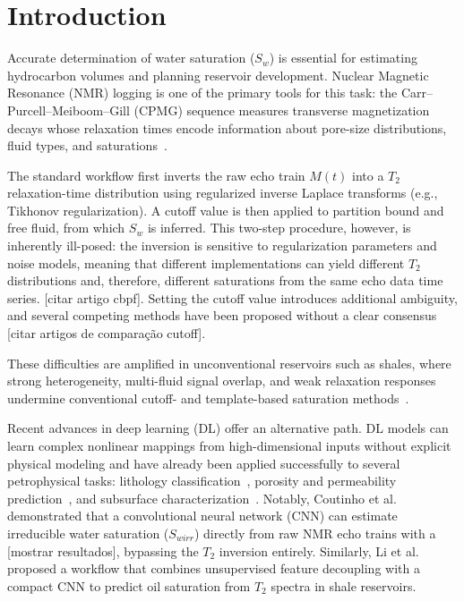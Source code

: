 \documentclass[runningheads]{llncs}
\begin{document}
\section{Introduction}
\label{sec:intro}

Accurate determination of water saturation ($S_w$) is essential for estimating hydrocarbon volumes
and planning reservoir development. Nuclear Magnetic Resonance (NMR) logging is one of the primary
tools for this task: the Carr--Purcell--Meiboom--Gill (CPMG) sequence measures transverse
magnetization decays whose relaxation times encode information about pore-size distributions,
fluid types, and saturations~\cite{ref_coates1999}.


The standard workflow first inverts the raw echo train $M(t)$ into a $T_2$ relaxation-time
distribution using regularized inverse Laplace transforms (e.g., Tikhonov regularization).
A cutoff value is then applied to partition bound and free fluid, from which $S_w$ is inferred.
This two-step procedure, however, is inherently ill-posed: the inversion is sensitive to
regularization parameters and noise models, meaning that different implementations can yield
different $T_2$ distributions and, therefore, different saturations from the same echo data time series. [citar artigo cbpf].
Setting the cutoff value introduces additional ambiguity, and several competing methods have been proposed without a clear consensus [citar artigos de comparação cutoff].

These difficulties are amplified in unconventional reservoirs such as shales, where strong
heterogeneity, multi-fluid signal overlap, and weak relaxation responses undermine conventional
cutoff- and template-based saturation methods~\cite{ref_li2026}.

Recent advances in deep learning (DL) offer an alternative path. DL models can learn complex
nonlinear mappings from high-dimensional inputs without explicit physical modeling and have already
been applied successfully to several petrophysical tasks: lithology classification~\cite{ref_valentin2019},
porosity and permeability prediction~\cite{ref_bom2021}, and subsurface
characterization~\cite{ref_kurup2006}. Notably, Coutinho et al.~\cite{ref_fraga2025} demonstrated
that a convolutional neural network (CNN) can estimate irreducible water saturation ($S_{wirr}$)
directly from raw NMR echo trains with a [mostrar resultados], bypassing
the $T_2$ inversion entirely. Similarly, Li et al.~\cite{ref_li2026} proposed a workflow that
combines unsupervised feature decoupling with a compact CNN to predict oil saturation from
$T_2$ spectra in shale reservoirs. 
\end{document}
